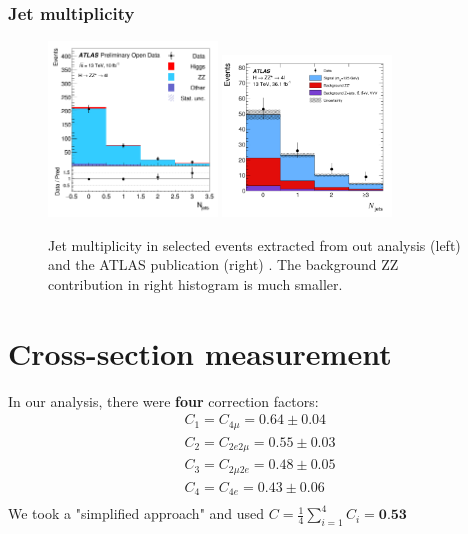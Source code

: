 \documentclass[aspectratio=1610, english]{beamer}
\begin{document}
\begin{frame}
\frametitle{Jet multiplicity}

\begin{figure} [H]
\centering
\includegraphics[width=0.4\textwidth]{hist_n_jets.png}
\includegraphics[width=0.4\textwidth]{hist_n_jets_pub.png}
\caption{ Jet multiplicity in selected events extracted from out analysis (left) and the ATLAS publication (right) \cite{hzz}. The background ZZ contribution in right histogram is much smaller.}
\end{figure}

\end{frame}


\section{Cross-section measurement}

\begin{frame}
In our analysis, there were \textbf{four} correction factors:
\begin{eqnarray}
C_1=C_{4\mu}=0.64 \pm 0.04 \nonumber \\
C_2=C_{2e2\mu}=0.55 \pm 0.03 \nonumber \\
C_3=C_{2\mu2e}=0.48 \pm 0.05 \nonumber \\
C_4=C_{4e}=0.43 \pm 0.06 \nonumber \\
\end{eqnarray}
\vspace{1cm}
We took a "simplified approach" and used $C=\frac{1}{4}\sum_{i=1}^{4} C_i=\textbf{0.53}$
\end{frame}
\end{document}
